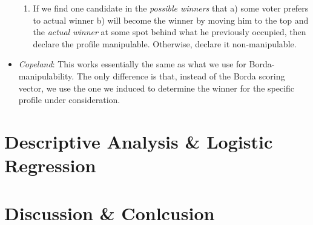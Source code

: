 \documentclass[10pt,a4paper]{article}
\begin{document}
\begin{itemize}
\begin{enumerate}
\item If we find one candidate in the \textit{possible winners} that a) some voter prefers to actual winner b) will become the winner by moving him to the top and the \textit{actual winner} at some spot behind what he previously occupied, then declare the profile manipulable. Otherwise, declare it non-manipulable.
\end{enumerate}
\item \textit{Copeland}: This works essentially the same as what we use for Borda-manipulability. The only difference is that, instead of the Borda scoring vector, we use the one we induced to determine the winner for the specific profile under consideration.
\end{itemize}
\section{Descriptive Analysis \& Logistic Regression}
\section{Discussion \& Conlcusion}
\end{document}
